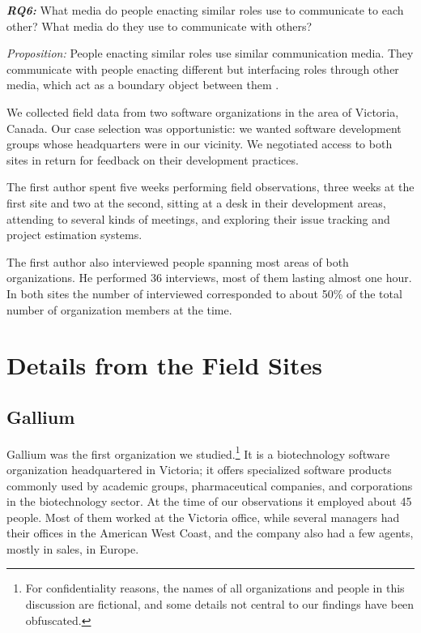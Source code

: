 \documentclass[10pt, conference, compsocconf]{IEEEtran}
\begin{document}
\textbf{\emph{RQ6:}} What media do people enacting similar roles use to communicate to each other? What media do they use to communicate with others?

\emph{Proposition:} People enacting similar roles use similar communication media. They communicate with people enacting different but interfacing roles through other media, which act as a boundary object between them \cite{Bowker1999}.

We collected field data from two software organizations in the area of Victoria, Canada. Our case selection was opportunistic: we wanted software development groups whose headquarters were in our vicinity. We negotiated access to both sites in return for feedback on their development practices.

The first author spent five weeks performing field observations, three weeks at the first site and two at the second, sitting at a desk in their development areas, attending to several kinds of meetings, and exploring their issue tracking and project estimation systems.

The first author also interviewed people spanning most areas of both organizations. He performed 36 interviews, most of them lasting almost one hour. In both sites the number of interviewed corresponded to about 50\% of the total number of organization members at the time.




\section{Details from the Field Sites}

\subsection{Gallium}

Gallium was the first organization we studied.\footnote{For confidentiality reasons, the names of all organizations and people in this discussion are fictional, and some details not central to our findings have been obfuscated.} It is a biotechnology software organization headquartered in Victoria; it offers specialized software products commonly used by academic groups, pharmaceutical companies, and corporations in the biotechnology sector. At the time of our observations it employed about 45 people. Most of them worked at the Victoria office, while several managers had their offices in the American West Coast, and the company also had a few agents, mostly in sales, in Europe.
\end{document}

